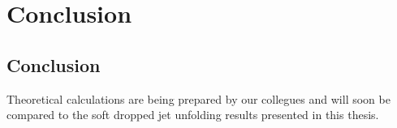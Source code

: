 \chapter{Conclusion}\label{chap:conclusion}

\vspace{-5pt}
\section{Conclusion}\label{sec:concld}


Theoretical calculations are being prepared by our collegues and will soon be compared to the soft dropped jet unfolding results presented in this thesis.


